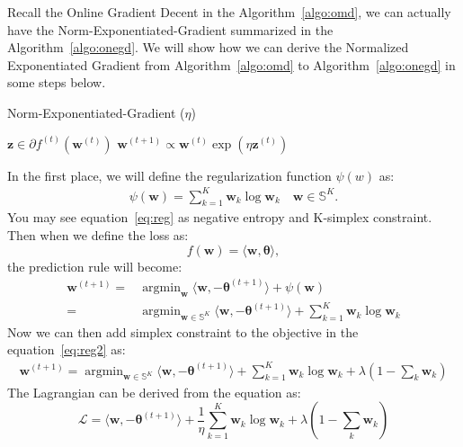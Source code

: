 \documentclass[11pt]{article}
\DeclareMathOperator*{\argmin}{argmin}
\newcommand{\btheta}{\boldsymbol{\theta}}
\newcommand{\bz}{\boldsymbol{z}}
\newcommand{\bw}{\boldsymbol{w}}
\begin{document}
Recall the Online Gradient Decent in the Algorithm~\ref{algo:omd}, we can actually have the Norm-Exponentiated-Gradient summarized in the Algorithm~\ref{algo:onegd}. We will show how we can derive the Normalized Exponentiated Gradient from Algorithm~\ref{algo:omd} to Algorithm~\ref{algo:onegd} in some steps below.
%
%
%
\begin{algorithm}[H]
\caption{Norm-Exponentiated-Gradient ($\eta$)}
\label{algo:onegd}
\begin{algorithmic}[1]
%
\STATE $\bz \in \partial f^{(t)}(\bw^{(t)})$ 
%
\STATE $\bw^{(t+1)} \propto \bw^{(t)} \exp{(\eta \bz^{(t)})}$ 
%
\ENDFOR
\end{algorithmic}
\end{algorithm}
%
In the first place, we will define the regularization function $\psi (w)$ as:
\begin{align}\label{eq:reg}
    \psi (\bw) = \sum_{k=1}^{K} \bw_k \log \bw_k \quad \bw\in \mathbb{S}^K.
\end{align}
%
You may see equation~\ref{eq:reg} as negative entropy and K-simplex constraint. Then when we define the loss as:
$$f(\bw) = \langle \bw, \btheta\rangle,$$
the prediction rule will become:
\begin{align}\label{eq:reg2}
    \bw^{(t+1)} = & \argmin_{\bw} \langle \bw, -\btheta^{(t+1)} \rangle + \psi (\bw)\nonumber \\
    = & \argmin_{\bw \in \mathbb{S}^K} \langle \bw, -\btheta^{(t+1)} \rangle + \sum_{k=1}^{K} \bw_k \log \bw_k
\end{align}
Now we can then add simplex constraint to the objective in the equation~\ref{eq:reg2} as:
\begin{align}
    \bw^{(t+1)} = \argmin_{\bw \in \mathbb{S}^K} \langle \bw, -\btheta^{(t+1)} \rangle + \sum_{k=1}^{K} \bw_k \log \bw_k + \lambda \left( 1- \sum_k \bw_k\right)
\end{align}
The Lagrangian can be derived from the equation as:
$$ \mathcal{L} = \langle \bw, -\btheta^{(t+1)} \rangle + \frac{1}{\eta}\sum_{k=1}^{K} \bw_k \log \bw_k + \lambda \left( 1- \sum_k \bw_k\right)$$
\end{document}
